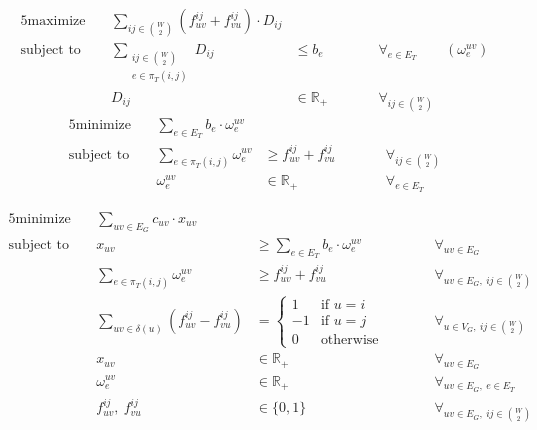 \begin{alignat*}{5}
    \text{maximize}\ && \sum_{ij \in \binom{W}{2}} (f_{uv}^{ij} + f_{vu}^{ij}) \cdot D_{ij} &&& \\
    \text{subject to}\ && \sum_{\substack{ij \in \binom{W}{2}\\e \in \pi_T(i,j)}} D_{ij} &\le b_e &&\qquad \forall_{e \in E_T} \qquad (\omega_e^{uv}) \\
    && D_{ij} &\in \mathbb{R}_+ &&\qquad \forall_{ij \in \binom{W}{2}}
\end{alignat*}
\hrulefill
\begin{alignat*}{5}
    \text{minimize}\ && \sum_{e \in E_T} b_e \cdot \omega_e^{uv} &&& \\
    \text{subject to}\ && \sum_{e \in \pi_T(i,j)} \omega_e^{uv} &\ge f_{uv}^{ij} + f_{vu}^{ij} &&\qquad \forall_{ij \in \binom{W}{2}} \\
    && \omega_e^{uv} &\in \mathbb{R}_+ &&\qquad \forall_{e \in E_T}
\end{alignat*}

\begin{alignat*}{5}
    \text{minimize}\ && \sum_{uv \in E_G} c_{uv} \cdot x_{uv} &&& \\
    \text{subject to}\ && x_{uv} &\ge \sum_{e \in E_T} b_e \cdot \omega_e^{uv} &&\qquad \forall_{uv \in E_G} \\
    && \sum_{e \in \pi_T(i,j)} \omega_e^{uv} &\ge f_{uv}^{ij} + f_{vu}^{ij} &&\qquad \forall_{uv \in E_G,\ ij \in \binom{W}{2}} \\
    && \sum_{uv \in \delta(u)} (f_{uv}^{ij} - f_{vu}^{ij}) &= \begin{cases}
                                                                1 & \text{if $u = i$} \\
                                                                -1 & \text{if $u = j$} \\
                                                                0 & \text{otherwise}
    \end{cases} &&\qquad \forall_{u \in V_G,\ ij \in \binom{W}{2}} \\
    && x_{uv} &\in \mathbb{R}_+ &&\qquad \forall_{uv \in E_G} \\
    && \omega_e^{uv} &\in \mathbb{R}_+ &&\qquad \forall_{uv \in E_G,\ e \in E_T} \\
    && f_{uv}^{ij},\ f_{vu}^{ij} &\in \{ 0, 1 \} &&\qquad \forall_{uv \in E_G,\ ij \in \binom{W}{2}}
\end{alignat*}%

